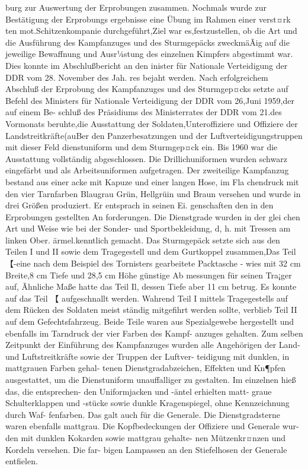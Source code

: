 burg zur Auswertung der Erprobungen zusammen.
Nochmals wurde zur Bestätigung der Erprobungs
ergebnisse eine Übung im Rahmen einer verst¤rk
ten mot.Schitzenkompanie durchgeführt,Ziel war
es,festzustellen, ob die Art und die Ausführung des
Kampfanzuges und des Sturmgepäcks zweckmäÃig
auf die jeweilige Bewaffnung und Ausr¼stung des
einzelnen Kimpfers abgestimmt war. Dies konnte
im Abschlußbericht an den inister für Nationale
Verteidigung der DDR vom 28. November des Jah.
res bejaht werden.
Nach erfolgreichem Abschluß der Erprobung des
Kampfanzuges und des Sturmgep¤cks setzte auf
Befehl des Ministers für Nationale Verteidigung
der DDR vom 26,Juni 1959,der auf einem Be-
schluß des Präsidiums des Ministerrates der DDR
vom 21.des Vormonats beruhte,die Ausstattung
der Soldaten,Unteroffiziere und Offiziere der
Landstreitkräfte(auBer den Panzerbesatzungen
und der Luftverteidigungstruppen mit dieser Feld
dienstuniform und dem Sturmgep¤ck ein. Bis 1960
war die Ausstattung vollständig abgeschlossen. Die
Drillichuniformen wurden schwarz eingefärbt und
als Arbeitsuniformen aufgetragen.
Der zweiteilige Kampfanzug bestand aus einer
acke mit Kapuze und einer langen Hose, im Fla
chendruck mit den vier Tarnfarben Blaugrau
Grün, Hellgrüin und Braun versehen und wurde in
drei Größen produziert. Er entsprach in seinen Ei.
genschaften den in den Erprobungen gestellten An
forderungen. Die Dienstgrade wurden in der glei
chen Art und Weise wie bei der Sonder- und
Sportbekleidung, d, h. mit Tressen am linken Ober.
ärmel.kenntlich gemacht.
Das Sturmgepäck setzte sich aus den Teilen I
und II sowie dem Tragegestell und dem Gurtkoppel
zusammen,Das Teil 【-eine nach dem Beispiel des
Tornisters gearbeitete Packtasche - wies mit 32 cm
Breite,8 cm Tiefe und 28,5 cm Höhe günstige Ab
messungen für seinen Tra¡ger auf, Ãhnliche Maße
hatte das Teil Il, dessen Tiefe aber 11 cm betrug. Es
konnte auf das Teil 【 aufgeschnallt werden. Wahrend Teil I mittels Tragegestells auf dem Rücken des
Soldaten meist ständig mitgefihrt werden sollte,
verblieb Teil II auf dem Gefechtsfahrzeug. Beide
Teile waren aus Spezialgewebe hergestellt und
ebenfalls im Tarndruck der vier Farben des Kampf-
anzuges gehalten.
Zum selben Zeitpunkt der Einführung
des
Kampfanzuges wurden alle Angehörigen der Land-
und Luftstreitkräfte sowie der Truppen der Luftver-
teidigung mit dunklen, in mattgrauen Farben gehal-
tenen Dienstgradabzeichen, Effekten und Kn¶pfen
ausgestattet, um die Dienstuniform unauffalliger zu
gestalten. Im einzelnen hieß das, die entsprechen-
den Uniformjacken und -äntel erhielten matt-
graue Schulterklappen und -stücke sowie dunkle
Kragenspiegel, ohne Kennzeichnung durch Waf-
fenfarben. Das galt auch für die Generale. Die
Dienstgradsterne waren ebenfalls mattgrau. Die
Kopfbedeckungen der Offiziere und Generale wur-
den mit dunklen Kokarden sowie mattgrau gehalte-
nen Mützenkr¤nzen und Kordeln versehen. Die far-
bigen Lampassen an den Stiefelhosen der Generale
entfielen.